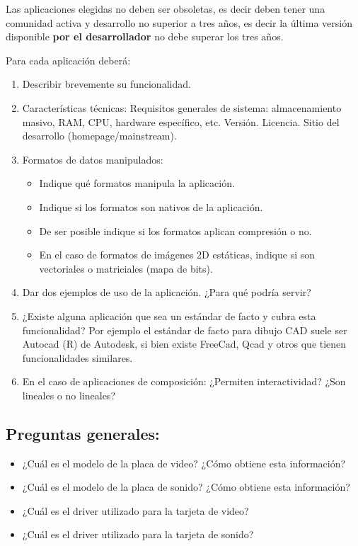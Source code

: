 \documentclass[12pt]{article}
\begin{document}
Las aplicaciones elegidas no deben ser obsoletas, es decir deben
tener una comunidad activa y desarrollo no superior a tres años, 
es decir la última versión disponible {\bf por el desarrollador}
no debe superar los tres años. 

Para cada aplicación deberá:
\begin{enumerate}
\item Describir brevemente su funcionalidad. 
\item Características técnicas: Requisitos generales 
de sistema: almacenamiento masivo, RAM, CPU, hardware específico, etc. 
Versión. Licencia. Sitio del desarrollo (homepage/mainstream). 
\item Formatos de datos manipulados: 
	\begin{itemize}
	\item Indique qué formatos manipula la aplicación.
	\item Indique si los formatos son nativos de la aplicación. 
	\item De ser posible indique si los formatos aplican compresión o no.
	\item En el caso de formatos de imágenes 2D estáticas, indique si son 
	vectoriales o matriciales (mapa de bits).
	\end{itemize} 
\item Dar dos ejemplos de uso de la aplicación. ¿Para qué podría servir? 
\item ¿Existe alguna aplicación que sea un estándar de facto y cubra esta
funcionalidad? Por ejemplo el estándar de facto para dibujo CAD suele ser
Autocad (R) de Autodesk, si bien existe FreeCad, Qcad y otros que tienen
funcionalidades similares. 
\item En el caso de aplicaciones de composición: ¿Permiten interactividad? 
¿Son lineales o no lineales? 
\end{enumerate}

\subsection*{Preguntas generales:}
\begin{itemize}
\item ¿Cuál es el modelo de la placa de video? ¿Cómo obtiene esta información?
\item ¿Cuál es el modelo de la placa de sonido? ¿Cómo obtiene esta información?
\item ¿Cuál es el driver utilizado para la tarjeta de video?
\item ¿Cuál es el driver utilizado para la tarjeta de sonido?
\end{itemize}
\end{document}
